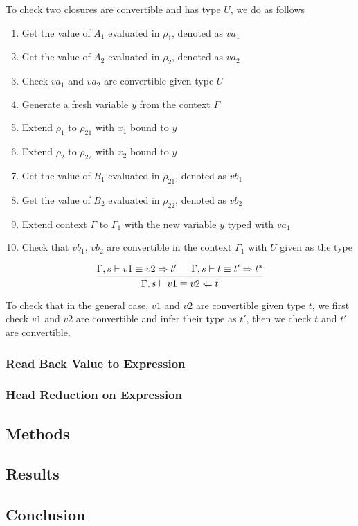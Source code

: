 \documentclass{article}
\theoremstyle{remark}
\begin{document}
To check two closures are convertible and has type $U$, we do as follows
\begin{enumerate}
\item Get the value of $A_1$ evaluated in $\rho_1$, denoted as $va_1$
\item Get the value of $A_2$ evaluated in $\rho_2$, denoted as $va_2$
\item Check $va_1$ and $va_2$ are convertible given type $U$
\item Generate a fresh variable $y$ from the context $\Gamma$
\item Extend $\rho_1$ to $\rho_{21}$ with $x_1$ bound to $y$ 
\item Extend $\rho_2$ to $\rho_{22}$ with $x_2$ bound to $y$ 
\item Get the value of $B_1$ evaluated in $\rho_{21}$, denoted as $vb_1$
\item Get the value of $B_2$ evaluated in $\rho_{22}$, denoted as $vb_2$
\item Extend context $\Gamma$ to $\Gamma_1$ with the new variable $y$ typed with $va_1$
\item Check that $vb_1$, $vb_2$ are convertible in the context $\Gamma_1$ with $U$ given as the type
\end{enumerate}

\begin{align}
  \begin{prooftree}
    \hypo{\Gamma,s \vdash v1 \equiv v2 \Rightarrow t'}
    \hypo{\Gamma,s \vdash t \equiv t' \Rightarrow t^*}
    \infer2{\Gamma,s \vdash v1 \equiv v2 \Leftarrow t} 
  \end{prooftree}
\end{align}

To check that in the general case, $v1$ and $v2$ are convertible given type $t$, we first check $v1$ and $v2$ are convertible and infer their type as $t'$, then we check $t$ and $t'$ are convertible.

\subsubsection{Read Back Value to Expression}

\subsubsection{Head Reduction on Expression}

\subsection{Methods}

\subsection{Results}


\subsection{Conclusion}


\clearpage



\end{document}
